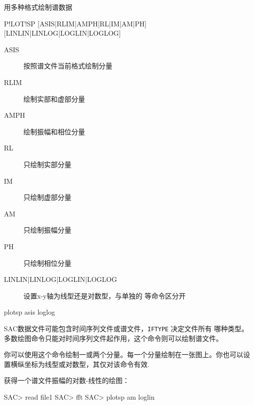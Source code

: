 \label{cmd:plotsp}

用多种格式绘制谱数据

\begin{SACSTX}
P!LOT!SP [ASIS|RLIM|AMPH|RL|IM|AM|PH] [LINLIN|LINLOG|LOGLIN|LOGLOG]
\end{SACSTX}

\begin{description}
\item [ASIS] 按照谱文件当前格式绘制分量
\item [RLIM] 绘制实部和虚部分量
\item [AMPH] 绘制振幅和相位分量
\item [RL] 只绘制实部分量
\item [IM] 只绘制虚部分量
\item [AM] 只绘制振幅分量
\item [PH] 只绘制相位分量
\item [LINLIN|LINLOG|LOGLIN|LOGLOG] 设置x-y轴为线型还是对数型，与单独的
     等命令区分开
\end{description}

\begin{SACDFT}
plotsp asis loglog
\end{SACDFT}

SAC数据文件可能包含时间序列文件或谱文件，\texttt{IFTYPE} 决定文件所有
哪种类型。多数绘图命令只能对时间序列文件起作用，这个命令则可以绘制谱文件。

你可以使用这个命令绘制一或两个分量。每一个分量绘制在一张图上。你也可以设
置横纵坐标为线型或对数型，其仅对该命令有效.

获得一个谱文件振幅的对数-线性的绘图：
\begin{SACCode}
SAC> read file1
SAC> fft
SAC> plotsp am loglin
\end{SACCode}
